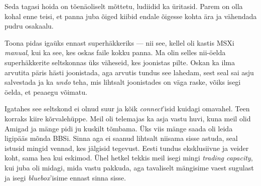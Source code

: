 
Seda tagasi hoida on tõenäoliselt mõttetu, ludiidid ka üritasid. 
Parem on olla kohal enne teisi, et panna juba õiged kiibid endale 
õigesse kohta ära ja vähendada pudru osakaalu. 


Toona pidas igaüks ennast superhäkkeriks --- nii see, kellel oli kastis 
MSXi \emph{manual}, kui ka see, kes oskas faile kokku panna. Ma olin selles 
nii-öelda superhäkkerite seltskonnas üks väheseid, kes joonistas 
pilte. Oskan ka ilma arvutita päris hästi joonistada, aga arvutis 
tundus see lahedam, sest seal sai asju salvestada ja ka
\emph{undo} teha, mis lihtsalt joonistades on 
väga raske, võiks isegi öelda, et peaaegu võimatu. 

Igatahes see seltskond ei olnud suur ja kõik \emph{connect}'isid 
kuidagi omavahel. Teen korraks kiire kõrvalehüppe. Meil oli telemajas ka asja 
vastu huvi,  kuna meil olid Amigad ja mänge pidi ju kuskilt tõmbama. 
Üks viis mänge saada oli leida ligipääs mõnda 
BBSi. Sinna aga ei saanud lihtsalt niisama sisse astuda, seal istusid mingid 
vennad, kes jälgisid
tegevust. Eesti tundus eksklusiivne ja veider koht, sama hea kui 
eskimod. Ühel hetkel tekkis meil isegi mingi \emph{trading capacity}, kui 
juba oli midagi, mida vastu pakkuda, aga tavaliselt mängisime 
vaest sugulast ja isegi 
\emph{bluebox}'isime ennast sinna sisse. 


